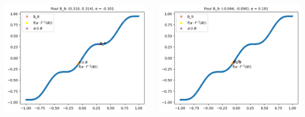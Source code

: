 \documentclass{beamer}
\begin{document}
                \begin{frame}
                    \begin{columns}
                        \begin{column}{0.5\textwidth}
                            \centering
                            \includegraphics[width=0.9\linewidth]{./images/alpha1.png}
                        \end{column}
                        \begin{column}{0.5\textwidth}
                            \centering
                            \includegraphics[width=0.9\linewidth]{./images/alpha4.png}
                        \end{column}
                    \end{columns}
                \end{frame}
\end{document}
